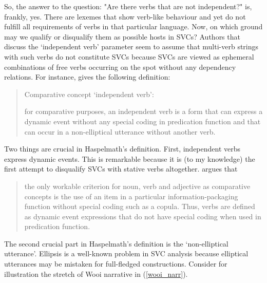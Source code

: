 So, the answer to the question: "Are there verbs that are not independent?" is, frankly, yes. There are lexemes that show verb-like behaviour and yet do not fulfill all requirements of verbs in that particular language. Now, on which ground may we qualify or disqualify them as possible hosts in SVCs? Authors that discuss the `independent verb' parameter seem to assume that multi-verb strings with such verbs do not constitute SVCs because SVCs are viewed as ephemeral combinations of free verbs occurring on the spot without any dependency relations. For instance, \citet[303]{haspelmath2016serial} gives the following definition: \begin{quote}Comparative concept `independent verb’:

for comparative purposes, an independent verb is a form that can express a dynamic event without any special coding in predication function and that can occur in a non-elliptical utterance without another verb.\end{quote}

Two things are crucial in Haspelmath's definition. First, independent verbs express dynamic events. This is remarkable because it is (to my knowledge) the first attempt to disqualify SVCs with stative verbs altogether. \citet[302]{haspelmath2016serial} argues that \begin{quote}the only workable criterion for noun, verb and adjective as comparative concepts is the use of an item in a particular information-packaging function without special coding such as a copula. Thus, verbs are defined as dynamic event expressions that do not have special coding when used in predication function.\end{quote}

The second crucial part in Haspelmath's definition is the `non-elliptical utterance'. Ellipsis is a well-known problem in SVC analysis because elliptical utterances may be mistaken for full-fledged constructions. Consider for illustration the stretch of Wooi narrative in (\ref{wooi_narr}).


